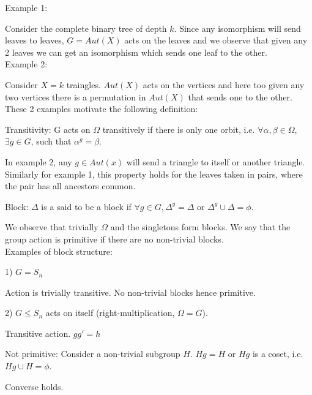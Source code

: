 Example 1:

Consider the complete binary tree of depth $k$. Since any isomorphism will send leaves to leaves, $G = Aut(X)$ acts on the leaves and we observe that given any 2 leaves we can get an isomorphism which sends one leaf to the other.\\

Example 2:

Consider $X = k$ traingles. $Aut(X)$ acts on the vertices and here too given any two vertices there is a permutation in $Aut(X)$ that sends one to the other. \\


These 2 examples motivate the following definition:

\begin{definition}{Transitivity:}
G acts on $\Omega$ transitively if there is only one orbit, i.e. $\forall \alpha,\beta \in \Omega$, $\exists g \in G$, such that $\alpha^g = \beta$.
\end{definition}


In example 2, any $g \in Aut(x)$ will send a triangle to itself or another triangle. Similarly for example 1, this property holds for the leaves taken in pairs, where the pair has all ancestors common.\\

\begin{definition}{Block:}
$\Delta$ is a said to be a block if $\forall g \in G, \Delta^g = \Delta$ or $\Delta^g \cup \Delta = \phi$.
\end{definition}


We observe that trivially $\Omega$ and the singletons form blocks. We say that the group action is primitive if there are no non-trivial blocks.\\


Examples of block structure:

1) $G = S_n$ 

Action is trivially transitive. No non-trivial blocks hence primitive.

2) $G \leq S_n$ acts on itself (right-multiplication, $\Omega = G$).

Transitive action. $g g' = h$

Not primitive: Consider a non-trivial subgroup $H$. $Hg = H$ or $Hg$ is a coset, i.e. $Hg \cup H = \phi$.

Converse holds.


